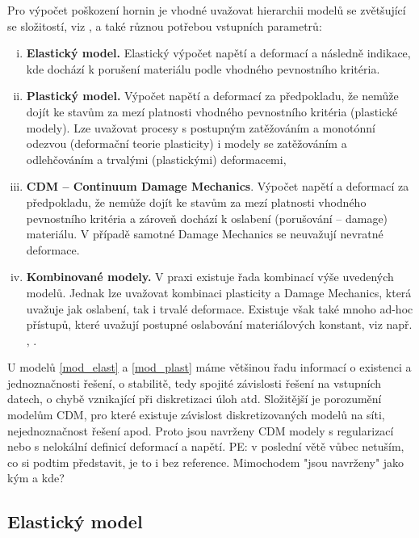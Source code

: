 \documentclass{article}
\newcommand{\pe}[1]{{\color{orange} PE: #1}}
\begin{document}
Pro výpočet poškození hornin je vhodné uvažovat hierarchii modelů se zvětšující se složitostí, viz \cite{Blaheta2013a}, a také různou potřebou vstupních parametrů:
\begin{enumerate}[(i)]
	\item \label{mod_elast} {\bf Elastický model.} Elastický výpočet napětí a deformací a následně indikace, kde dochází k porušení materiálu podle vhodného pevnostního kritéria.
	\item \label{mod_plast} {\bf Plastický model.} Výpočet napětí a deformací za předpokladu, že nemůže dojít ke stavům za mezí platnosti vhodného pevnostního kritéria (plastické modely). Lze uvažovat procesy s postupným zatěžováním a monotónní odezvou (deformační teorie plasticity) i modely se zatěžováním a odlehčováním a trvalými (plastickými) deformacemi,
	\item \label{mod_damage} {\bf CDM -- Continuum Damage Mechanics}. Výpočet napětí a deformací za předpokladu, že nemůže dojít ke stavům za mezí platnosti vhodného pevnostního kritéria a zároveň dochází k oslabení (porušování --  damage) materiálu. V případě samotné Damage Mechanics se neuvažují nevratné deformace.
	\item \label{mod_irev_cdm} {\bf Kombinované modely.} V praxi existuje řada kombinací výše uvedených modelů. Jednak lze uvažovat kombinaci plasticity a Damage Mechanics, která uvažuje jak oslabení, tak i trvalé deformace. Existuje však také mnoho ad-hoc přístupů, které uvažují postupné oslabování materiálových konstant, viz např. \cite{Perras2016}, \cite{Carranza-Torres1999}.
\end{enumerate}
U modelů \eqref{mod_elast} a \eqref{mod_plast} máme většinou řadu informací o existenci a jednoznačnosti
řešení, o stabilitě, tedy spojité závislosti řešení na vstupních datech, o chybě vznikající  při  diskretizaci  úloh  atd.  Složitější je porozumění  modelům CDM, pro které existuje závislost diskretizovaných  modelů na  síti, nejednoznačnost řešení  apod. Proto jsou navrženy CDM modely s regularizací nebo s nelokální definicí deformací a napětí. \pe{v poslední větě vůbec netuším, co si podtim představit, je to i bez reference. Mimochodem "jsou navrženy" jako kým a kde?}



\subsection{Elastický model}
\end{document}
